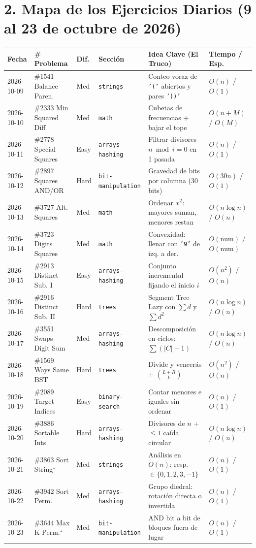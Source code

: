 \documentclass[letterpaper,10pt]{article}
\begin{document}
\section*{2. Mapa de los Ejercicios Diarios (9 al 23 de octubre de 2026)}

\begin{footnotesize}
\begin{tabularx}{\textwidth}{@{}llllXl@{}}
\toprule
\textbf{Fecha} & \textbf{\# Problema} & \textbf{Dif.} & \textbf{Secci\'on} & \textbf{Idea Clave (El Truco)} & \textbf{Tiempo / Esp.} \\
\midrule
2026-10-09 & \#1541 Balance Paren. & Med & \texttt{strings} & Conteo voraz de \texttt{'('} abiertos y pares \texttt{'))'} & $O(n)$ / $O(1)$ \\
2026-10-10 & \#2333 Min Squared Diff & Med & \texttt{math} & Cubetas de frecuencias + bajar el tope & $O(n + M)$ / $O(M)$ \\
2026-10-11 & \#2778 Special Squares & Easy & \texttt{arrays-hashing} & Filtrar divisores $n \bmod i = 0$ en 1 pasada & $O(n)$ / $O(1)$ \\
2026-10-12 & \#2897 Squares AND/OR & Hard & \texttt{bit-manipulation} & Gravedad de bits por columna (30 bits) & $O(30n)$ / $O(1)$ \\
2026-10-13 & \#3727 Alt. Squares & Med & \texttt{math} & Ordenar $x^2$: mayores suman, menores restan & $O(n \log n)$ / $O(n)$ \\
2026-10-14 & \#3723 Digits Squares & Med & \texttt{math} & Convexidad: llenar con \texttt{'9'} de izq. a der. & $O(\text{num})$ / $O(\text{num})$ \\
2026-10-15 & \#2913 Distinct Sub. I & Easy & \texttt{arrays-hashing} & Conjunto incremental fijando el inicio $i$ & $O(n^2)$ / $O(n)$ \\
2026-10-16 & \#2916 Distinct Sub. II & Hard & \texttt{trees} & Segment Tree Lazy con $\sum d$ y $\sum d^2$ & $O(n \log n)$ / $O(n)$ \\
2026-10-17 & \#3551 Swaps Digit Sum & Med & \texttt{arrays-hashing} & Descomposici\'on en ciclos: $\sum (|C|-1)$ & $O(n \log n)$ / $O(n)$ \\
2026-10-18 & \#1569 Ways Same BST & Hard & \texttt{trees} & Divide y vencer\'as + $\binom{L+R}{L}$ & $O(n^2)$ / $O(n)$ \\
2026-10-19 & \#2089 Target Indices & Easy & \texttt{binary-search} & Contar menores e iguales sin ordenar & $O(n)$ / $O(1)$ \\
2026-10-20 & \#3886 Sortable Ints & Hard & \texttt{arrays-hashing} & Divisores de $n$ + $\le 1$ ca\'ida circular & $O(n \log n)$ / $O(n)$ \\
2026-10-21 & \#3863 Sort String$^\star$ & Med & \texttt{strings} & An\'alisis en $O(n)$: resp. $\in \{0,1,2,3,-1\}$ & $O(n)$ / $O(1)$ \\
2026-10-22 & \#3942 Sort Perm. & Med & \texttt{arrays-hashing} & Grupo diedral: rotaci\'on directa o invertida & $O(n)$ / $O(1)$ \\
2026-10-23 & \#3644 Max K Perm.$^\star$ & Med & \texttt{bit-manipulation} & AND bit a bit de bloques fuera de lugar & $O(n)$ / $O(1)$ \\
\bottomrule
\end{tabularx}
\end{footnotesize}
\end{document}
